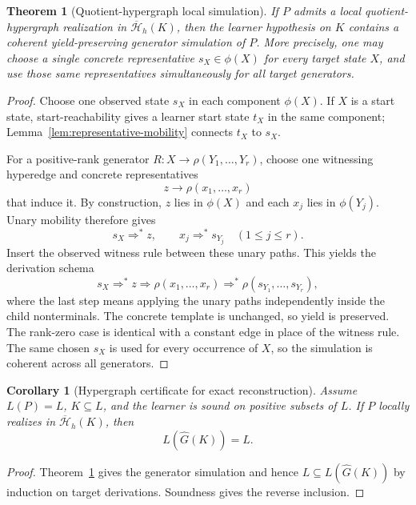 \documentclass[11pt]{article}
\newtheorem{theorem}[definition]{Theorem}
\newtheorem{corollary}[definition]{Corollary}
\begin{document}
\begin{theorem}[Quotient-hypergraph local simulation]
\label{thm:quotient-hypergraph-simulation}
If $P$ admits a local quotient-hypergraph realization in
$\overline{\mathcal H}_h(K)$, then the learner hypothesis on $K$ contains a
coherent yield-preserving generator simulation of $P$.  More precisely, one
may choose a single concrete representative $s_X\in\phi(X)$ for every target
state $X$, and use those same representatives simultaneously for all target
generators.
\end{theorem}
\begin{proof}
Choose one observed state $s_X$ in each component $\phi(X)$.  If $X$ is a
start state, start-reachability gives a learner start state $t_X$ in the same
component; Lemma~\ref{lem:representative-mobility} connects $t_X$ to $s_X$.

For a positive-rank generator
$R:X\to\rho(Y_1,\ldots,Y_r)$, choose one witnessing hyperedge and concrete
representatives
\[
  z\to\rho(x_1,\ldots,x_r)
\]
that induce it.  By construction, $z$ lies in $\phi(X)$ and each $x_j$ lies in
$\phi(Y_j)$.  Unary mobility therefore gives
\[
  s_X\Rightarrow^* z,
  \qquad
  x_j\Rightarrow^* s_{Y_j}
  \quad(1\le j\le r).
\]
Insert the observed witness rule between these unary paths.  This yields the
derivation schema
\[
  s_X
  \Rightarrow^*
  z
  \Rightarrow
  \rho(x_1,\ldots,x_r)
  \Rightarrow^*
  \rho(s_{Y_1},\ldots,s_{Y_r}),
\]
where the last step means applying the unary paths independently inside the
child nonterminals.  The concrete template is unchanged, so yield is
preserved.  The rank-zero case is identical with a constant edge in place of
the witness rule.  The same chosen $s_X$ is used for every occurrence of $X$,
so the simulation is coherent across all generators.
\end{proof}

\begin{corollary}[Hypergraph certificate for exact reconstruction]
\label{cor:hypergraph-exact}
Assume $L(P)=L$, $K\subseteq L$, and the learner is sound on positive subsets
of $L$.  If $P$ locally realizes in $\overline{\mathcal H}_h(K)$, then
\[
  L(\widehat G(K))=L.
\]
\end{corollary}
\begin{proof}
Theorem~\ref{thm:quotient-hypergraph-simulation} gives the generator
simulation and hence $L\subseteq L(\widehat G(K))$ by induction on target
derivations.  Soundness gives the reverse inclusion.
\end{proof}
\end{document}
